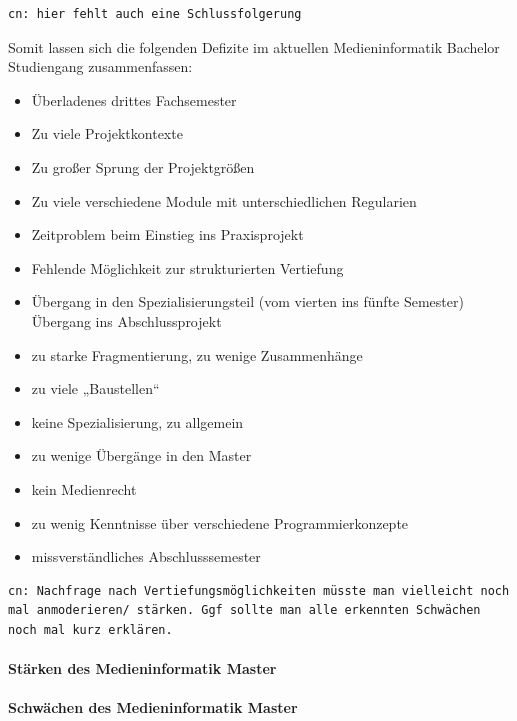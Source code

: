\begin{verbatim}
cn: hier fehlt auch eine Schlussfolgerung
\end{verbatim}

Somit lassen sich die folgenden Defizite im aktuellen Medieninformatik
Bachelor Studiengang zusammenfassen:

\begin{itemize}
\tightlist
\item
  Überladenes drittes Fachsemester
\item
  Zu viele Projektkontexte
\item
  Zu großer Sprung der Projektgrößen
\item
  Zu viele verschiedene Module mit unterschiedlichen Regularien
\item
  Zeitproblem beim Einstieg ins Praxisprojekt
\item
  Fehlende Möglichkeit zur strukturierten Vertiefung
\item
  Übergang in den Spezialisierungsteil (vom vierten ins fünfte Semester)
  Übergang ins Abschlussprojekt
\item
  zu starke Fragmentierung, zu wenige Zusammenhänge
\item
  zu viele „Baustellen``
\item
  keine Spezialisierung, zu allgemein
\item
  zu wenige Übergänge in den Master
\item
  kein Medienrecht
\item
  zu wenig Kenntnisse über verschiedene Programmierkonzepte
\item
  missverständliches Abschlusssemester
\end{itemize}

\begin{verbatim}
cn: Nachfrage nach Vertiefungsmöglichkeiten müsste man vielleicht noch mal anmoderieren/ stärken. Ggf sollte man alle erkennten Schwächen noch mal kurz erklären.
\end{verbatim}

\paragraph{Stärken des Medieninformatik
Master}\label{stuxe4rken-des-medieninformatik-master}

\paragraph{Schwächen des Medieninformatik
Master}\label{schwuxe4chen-des-medieninformatik-master}

